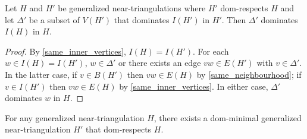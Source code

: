 \documentclass{patmorin}
\begin{document}
\begin{obs}
  Let $H$ and $H'$ be generalized near-triangulations where $H'$ dom-respects $H$ and let $\Delta'$ be a subset of $V(H')$ that dominates $I(H')$ in $H'$.  Then $\Delta'$ dominates $I(H)$ in $H$.
\end{obs}

\begin{proof}
  By \ref{same_inner_vertices}, $I(H)=I(H')$. For each $w\in I(H)=I(H')$, $w\in \Delta'$ or there exists an edge $vw\in E(H')$ with $v\in\Delta'$.  In the latter case, if $v\in B(H')$ then $vw\in E(H)$ by \ref{same_neighbourhood}; if $v\in I(H')$ then $vw\in E(H)$ by \ref{same_inner_vertices}. In either case, $\Delta'$ dominates $w$ in $H$.
\end{proof}

\begin{lem}\label{dom_minimal}
  For any generalized near-triangulation $H$, there exists a dom-minimal generalized near-triangulation $H'$ that dom-respects $H$. 
\end{lem}
\end{document}
